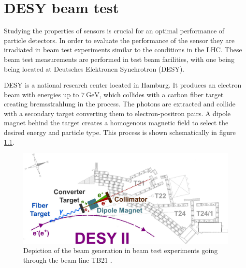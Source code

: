 \chapter{DESY beam test}
Studying the properties of sensors is crucial for an optimal performance of particle detectors.
In order to evaluate the performance of the sensor they are irradiated in beam test experiments similar to the conditions in the LHC.
These beam test measurements are performed in test beam facilities, with one being being located at Deutsches Elektronen Synchrotron (DESY).

DESY is a national research center located in Hamburg.
It produces an electron beam with energies up to
$\SI{7}{\GeV}$, which collides with a carbon fiber target creating bremsstrahlung in the process. The photons are extracted and collide with a secondary target
converting them to electron-positron pairs. A dipole magnet behind the target creates a homogenous magnetic field to select the desired energy and particle type. This process
is shown schematically in figure \ref{fig:testbeam}.

\begin{figure}
  \centering
  \includegraphics[height=0.4\textwidth]{images/desy_modified.jpg}
  \caption{Depiction of the beam generation in beam test experiments going through the beam line TB21 \cite{testbeam}.}
  \label{fig:testbeam}
\end{figure}


